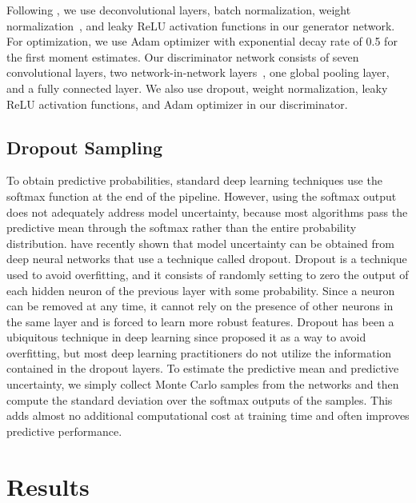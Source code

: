 \documentclass[fleqn,usenatbib]{mnras}
\begin{document}
Following \cite{salimans2016improved}, we use deconvolutional layers, batch normalization, weight normalization~\citep{salimans2016weight},
and leaky ReLU activation functions in our generator network.
For optimization, we use Adam optimizer with exponential decay rate of 0.5 for the first moment estimates.
Our discriminator network consists of seven convolutional layers, two network-in-network layers~\citep{lin2013network}, one global pooling layer,
and a fully connected layer.
We also use dropout, weight normalization, leaky ReLU activation functions, and Adam optimizer in our discriminator.

\subsection{Dropout Sampling}
  \label{sec:dropout_sampling}
 
To obtain predictive probabilities, standard deep learning techniques use the softmax function
at the end of the pipeline.
However, using the softmax output does not adequately address model uncertainty,
because most algorithms pass the predictive mean through the softmax rather than
the entire probability distribution.
\citet{gal2016dropout} have recently shown that model uncertainty
can be obtained from deep neural networks that use a technique called dropout.
Dropout is a technique used to avoid overfitting, and it consists of
randomly setting to zero the output of each hidden neuron of the previous layer with some probability.
Since a neuron can be removed at any time, it cannot rely on the presence of other neurons
in the same layer and is forced to learn more robust features.
Dropout has been a ubiquitous technique in deep learning since \citet{hinton2012improving}
proposed it as a way to avoid overfitting, but most deep learning practitioners
do not utilize the information contained in the dropout layers.
To estimate the predictive mean and predictive uncertainty,
we simply collect Monte Carlo samples from the networks and then compute
the standard deviation over the softmax outputs of the samples.
This adds almost no additional computational cost at training time and often improves predictive performance.

\section{Results}
  \label{sec:results}
\end{document}
